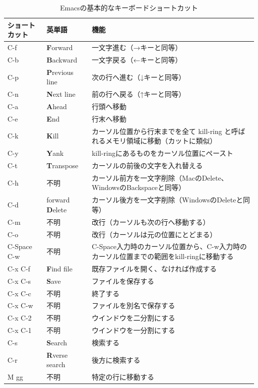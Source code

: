 \begin{table}
  \centering
  \caption{Emacsの基本的なキーボードショートカット}
  \label{tab_emacs}
  \begin{tabular}{llp{10cm}}
  \hline
ショートカット & 英単語 & 機能 \\ \hline\hline
C-f & {\bf F}orward & 一文字進む（→キーと同等） \\
C-b & {\bf B}ackward & 一文字戻る（←キーと同等） \\
C-p & {\bf P}revious line & 次の行へ進む（↓キーと同等） \\
C-n & {\bf N}ext line & 前の行へ戻る（↑キーと同等） \\
C-a & {\bf A}head & 行頭へ移動 \\
C-e & {\bf E}nd & 行末へ移動 \\
C-k & {\bf K}ill & カーソル位置から行末までを全て kill-ring と呼ばれるメモリ領域に移動（カットに類似） \\
C-y & {\bf Y}ank & kill-ringにあるものをカーソル位置にペースト \\
C-t & {\bf T}ranspose & カーソルの前後の文字を入れ替える \\
C-h & 不明 & カーソル前方を一文字削除（MacのDelete、WindowsのBackspaceと同等） \\
C-d & forward {\bf D}elete & カーソル後方を一文字削除（WindowsのDeleteと同等） \\
C-m & 不明 & 改行（カーソルも次の行へ移動する） \\
C-o & 不明 & 改行（カーソルは元の位置にとどまる） \\
C-Space C-w & 不明 & C-Space入力時のカーソル位置から、C-w入力時のカーソル位置までの範囲をkill-ringに移動する \\ \hline
C-x C-f & {\bf F}ind file & 既存ファイルを開く、なければ作成する \\
C-x C-s & {\bf S}ave & ファイルを保存する \\
C-x C-c & 不明 & 終了する \\
C-x C-w & 不明 & ファイルを別名で保存する \\
C-x C-2 & 不明 & ウインドウを二分割にする \\
C-x C-1 & 不明 & ウインドウを一分割にする \\
C-s & {\bf S}earch & 検索する \\
C-r & {\bf R}verse search & 後方に検索する \\
M gg & 不明 & 特定の行に移動する\\\hline
  \end{tabular}
\end{table}

